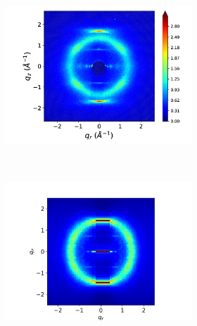 \documentclass{article}
\begin{document}
\begin{figure}[ht]

\begin{subfigure}{.83\linewidth}
	\centering
	\begin{subfigure}{0.4\linewidth}
		\centering
		\includegraphics[width=\linewidth, trim={2.5cm 0 4cm 1.25cm}, clip]{WAXS_raw.png}%
		\caption{}~\label{fig:raw_waxs}	
	\end{subfigure}%
	\begin{subfigure}{0.4\linewidth}
		\centering
		\includegraphics[width=\linewidth, trim={2cm 0 2.5cm 1.25cm}, clip]{rzplot_offset.png}
		\caption{}~\label{fig:rz_offset}
	\end{subfigure}
	\begin{subfigure}{0.4\linewidth}

\end{subfigure}
\end{subfigure}
\end{figure}
\end{document}
